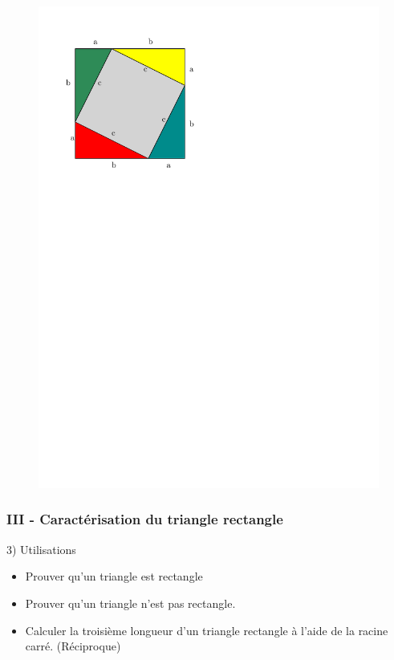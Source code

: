 \documentclass{beamer}
\begin{document}
\begin{frame}
\begin{multicols}{2}
\begin{figure}[H]
	  \includegraphics[width=\linewidth]{sources/1/demo-pytha-2.pdf}
	\end{figure}
	\end{multicols}


\end{frame}

\begin{frame}
  \frametitle{III - Caractérisation du triangle rectangle}

  \begin{block}{3) Utilisations}
        \begin{itemize}	
    \item Prouver qu'un triangle est rectangle
    \item Prouver qu'un triangle n'est pas rectangle. 
    \item Calculer la troisième longueur d'un triangle rectangle à l'aide de la racine carré. (Réciproque)
    \end{itemize}
  \end{block}


\end{frame}
\end{document}
